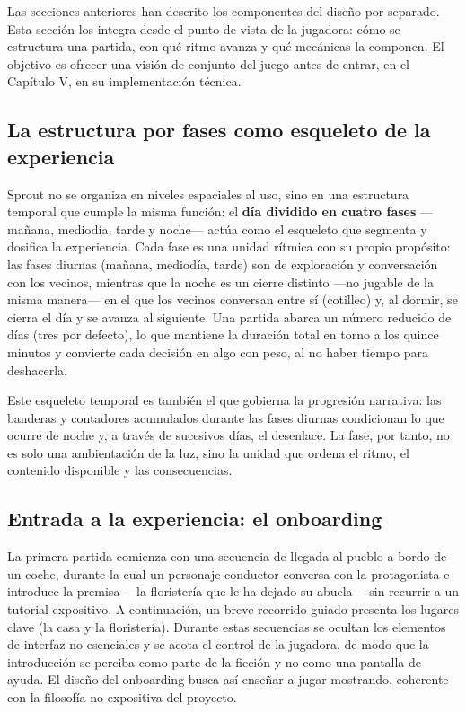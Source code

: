 \documentclass[12pt,twoside,titlepage]{report}
\begin{document}
Las secciones anteriores han descrito los componentes del diseño por separado. Esta sección los integra desde el punto de vista de la jugadora: cómo se estructura una partida, con qué ritmo avanza y qué mecánicas la componen. El objetivo es ofrecer una visión de conjunto del juego antes de entrar, en el Capítulo V, en su implementación técnica.

\subsection{La estructura por fases como esqueleto de la experiencia}

Sprout no se organiza en niveles espaciales al uso, sino en una estructura temporal que cumple la misma función: el \textbf{día dividido en cuatro fases} ---mañana, mediodía, tarde y noche--- actúa como el esqueleto que segmenta y dosifica la experiencia. Cada fase es una unidad rítmica con su propio propósito: las fases diurnas (mañana, mediodía, tarde) son de exploración y conversación con los vecinos, mientras que la noche es un cierre distinto ---no jugable de la misma manera--- en el que los vecinos conversan entre sí (cotilleo) y, al dormir, se cierra el día y se avanza al siguiente. Una partida abarca un número reducido de días (tres por defecto), lo que mantiene la duración total en torno a los quince minutos y convierte cada decisión en algo con peso, al no haber tiempo para deshacerla.

Este esqueleto temporal es también el que gobierna la progresión narrativa: las banderas y contadores acumulados durante las fases diurnas condicionan lo que ocurre de noche y, a través de sucesivos días, el desenlace. La fase, por tanto, no es solo una ambientación de la luz, sino la unidad que ordena el ritmo, el contenido disponible y las consecuencias.

\subsection{Entrada a la experiencia: el onboarding}

La primera partida comienza con una secuencia de llegada al pueblo a bordo de un coche, durante la cual un personaje conductor conversa con la protagonista e introduce la premisa ---la floristería que le ha dejado su abuela--- sin recurrir a un tutorial expositivo. A continuación, un breve recorrido guiado presenta los lugares clave (la casa y la floristería). Durante estas secuencias se ocultan los elementos de interfaz no esenciales y se acota el control de la jugadora, de modo que la introducción se perciba como parte de la ficción y no como una pantalla de ayuda. El diseño del onboarding busca así enseñar a jugar mostrando, coherente con la filosofía no expositiva del proyecto.
\end{document}
